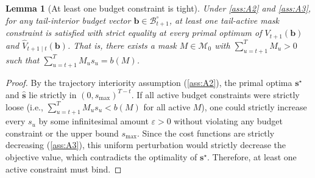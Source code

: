 \documentclass{uai2026} %
\newtheorem{lemma}{Lemma}
\newcommand{\1}{\mathbf{1}}
\newcommand{\mcal}{\mathcal{M}}
\newcommand{\bcal}{\mathcal{B}}
\begin{document}
\begin{lemma}[At least one budget constraint is tight]
  \label{lem:budget-tight-app}
  Under \ref{ass:A2} and \ref{ass:A3}, for any tail-interior budget vector $\mathbf{b} \in \bcal_{t+1}^\circ$, at least one tail-active mask constraint is satisfied with strict equality at every primal optimum of $V_{t+1}(\mathbf{b})$ and $\hat{V}_{t+1\mid t}(\mathbf{b})$. That is, there exists a mask $M \in \mcal_{0}$ with $\sum_{u=t+1}^T M_u > 0$ such that $\sum_{u=t+1}^{T} M_u s_u = b(M)$.
\end{lemma}
\begin{proof}
  By the trajectory interiority assumption (\ref{ass:A2}), the primal optima $\mathbf{s}^\star$ and $\hat{\mathbf{s}}$ lie strictly in $(0, s_{\max})^{T-t}$. If all active budget constraints were strictly loose (i.e., $\sum_{u=t+1}^{T} M_u s_u < b(M)$ for all active $M$), one could strictly increase every $s_u$ by some infinitesimal amount $\varepsilon > 0$ without violating any budget constraint or the upper bound $s_{\max}$. Since the cost functions are strictly decreasing (\ref{ass:A3}), this uniform perturbation would strictly decrease the objective value, which contradicts the optimality of $\mathbf{s}^\star$. Therefore, at least one active constraint must bind.
\end{proof}
\end{document}
